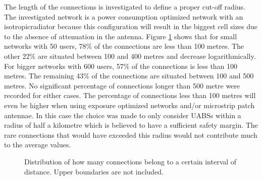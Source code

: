 The length of  the connections is investigated to define a proper cut-off radius.
The investigated network is a power consumption optimized network with an \gls{isotropicradiator} because this 
configuration will result in the biggest cell sizes due to the absence of attenuation in the antenna. 
Figure \ref{chart:distances} shows that for small networks with 50 users, 78\% of the connections
are less than 100 metres. The other 22\% are situated between 100 and 400 metres and decrease logarithmically.
For bigger networks with 600 users, 57\% of the connections is less than 100 metres. The remaining 43\%
of the connections are situated between 100 and 500 metres. No significant percentage of connections longer than 500 metre
were recorded for either cases.
The percentage of  connections less than 100 metres will even be higher when using exposure optimized networks 
and/or microstrip patch antennae.
In this case the choice was made to only consider \gls{UABS}s within a radius of half a kilometre which is believed 
to have a sufficient safety margin. The rare connections that would have exceeded this radius would not contribute much to 
the average values.

\begin{figure}[h]

      \caption{Distribution of how many connections belong to a certain interval of distance. Upper boundaries are not included.}
  \label{chart:distances}
\end{figure}

